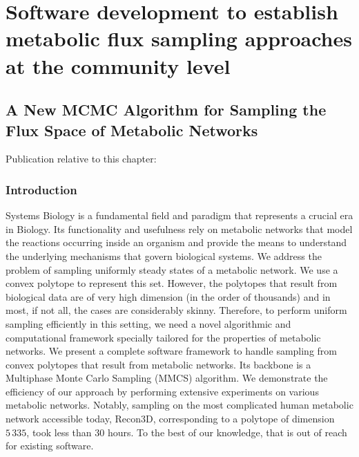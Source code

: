 % 
% 

\chapter{Software development to establish metabolic flux sampling 
         approaches at the community level}
\label{cha:dingo}


\section{A New MCMC Algorithm for Sampling the Flux Space of
Metabolic Networks}

   Publication relative to this chapter: \cite{chalki2021SoCG}

\subsection{Introduction}


   Systems Biology is a fundamental field and paradigm that represents a crucial era in Biology. 
   Its functionality and usefulness rely on metabolic networks that model the reactions occurring inside an organism and provide the means to understand the underlying mechanisms that govern biological systems. 
   We address the problem of sampling uniformly steady states of a metabolic network. 
   We use a convex polytope to represent this set. 
   However, the polytopes that result from biological data are of very high dimension (in the order of thousands) and in most, if not all, the cases are considerably skinny. 
   Therefore, to perform uniform sampling efficiently in this setting, we need a novel algorithmic and computational framework specially tailored for the properties of metabolic networks. 
   We present a complete software framework to handle sampling from convex polytopes that result from metabolic networks. 
   Its backbone is a Multiphase Monte Carlo Sampling (MMCS) algorithm.
   We demonstrate the efficiency of our approach by performing extensive experiments on various metabolic networks. 
   Notably, sampling on the most complicated human metabolic network accessible today, Recon3D, corresponding to a polytope of dimension $5\,335$, took less than $30$ hours. 
   To the best of our knowledge, that is out of reach for existing software.

